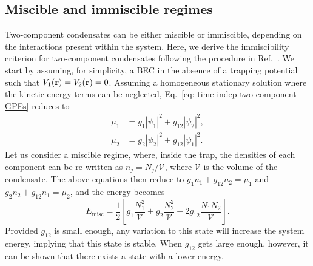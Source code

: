 \subsection{Miscible and immiscible regimes}
Two-component condensates can be either miscible or immiscible, depending on
the interactions present within the system.
Here, we derive the immiscibility criterion for two-component condensates
following the procedure in Ref.~\cite{Ao1998}.
We start by assuming, for simplicity, a BEC in the absence of a trapping
potential such that \(V_1(\vb{r}) = V_2(\vb{r}) = 0\).
Assuming a homogeneous stationary solution where the kinetic energy terms can
be neglected, Eq.~\eqref{eq: time-indep-two-component-GPEs} reduces to
\begin{equation}
    \begin{aligned}
        \mu_1 & = g_1|\psi_1|^2 + g_{12}|\psi_2|^2, \\
        \mu_2 & = g_2|\psi_2|^2 + g_{12}|\psi_1|^2.
    \end{aligned}
\end{equation}
Let us consider a miscible regime, where, inside the trap, the densities of each
component can be re-written as \(n_j=N_j/\mathcal{V}\), where \(\mathcal{V}\) is
the volume of the condensate.
The above equations then reduce to \(g_1n_1 + g_{12}n_2 = \mu_1\) and
\(g_2n_2 + g_{12}n_1 = \mu_2\), and the energy becomes
\begin{equation}
    E_\mathrm{misc} = \frac{1}{2}\left[g_1\frac{N_1^2}{\mathcal{V}}
    + g_2\frac{N_2^2}{\mathcal{V}} + 2g_{12}\frac{N_1N_2}{\mathcal{V}}\right].
\end{equation}
Provided \(g_{12}\) is small enough, any variation to this state will increase
the system energy, implying that this state is stable.
When \(g_{12}\) gets large enough, however, it can be shown that there exists
a state with a lower energy.

